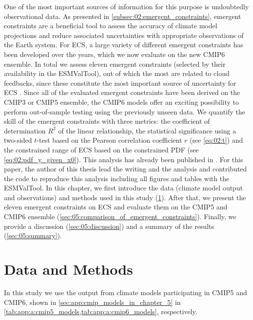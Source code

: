 One of the most important sources of information for this purpose is
undoubtedly observational data. As presented in
\cref{subsec:02:emergent_constraints}, emergent constraints are a beneficial
tool to assess the accuracy of climate model projections and reduce associated
uncertainties with appropriate observations of the Earth system. For \ac{ECS},
a large variety of different emergent constraints has been developed over the
years, which we now evaluate on the new \acs{CMIP}6 ensemble. In total we
assess eleven emergent constraints (selected by their availability in the
\ac{ESMValTool}), out of which the most are related to cloud feedbacks, since
these constitute the most important source of uncertainty for \ac{ECS}
. Since all of the evaluated emergent
constraints have been derived on the \acs{CMIP}3 or \ac{CMIP}5 ensemble, the
\ac{CMIP}6 models offer an exciting possibility to perform out-of-sample
testing using the previously unseen data. We quantify the skill of the emergent
constraints with three metrics: the coefficient of determination $R^2$ of the
linear relationship, the statistical significance using a two-sided $t$-test
based on the Pearson correlation coefficient $r$ (see \cref{eq:02:t}) and the
constrained range of \ac{ECS} based on the constrained \ac{PDF} (see
\cref{eq:02:pdf_y_given_x0}). This analysis has already been published in
\textcite{Schlund2020a}. For this paper, the author of this thesis lead the
writing and the analysis and contributed the code to reproduce this analysis
including all figures and tables with the \ac{ESMValTool}. In this chapter, we
first introduce the data (climate model output and observations) and methods
used in this study (\cref{sec:05:data_and_methods}). After that, we present the
eleven emergent constraints on \acs{ECS} and evaluate them on the \acs{CMIP}5
and \acs{CMIP}6 ensemble (\cref{sec:05:comparison_of_emergent_constraints}).
Finally, we provide a discussion (\cref{sec:05:discussion}) and a summary of
the results (\cref{sec:05:summary}).


\section{Data and Methods}
\label{sec:05:data_and_methods}

In this study we use the output from climate models participating in
\acs{CMIP}5 and \acs{CMIP}6, shown in \cref{sec:app:cmip_models_in_chapter_5}
in \cref{tab:app:a:cmip5_models,tab:app:a:cmip6_models}, respectively.


